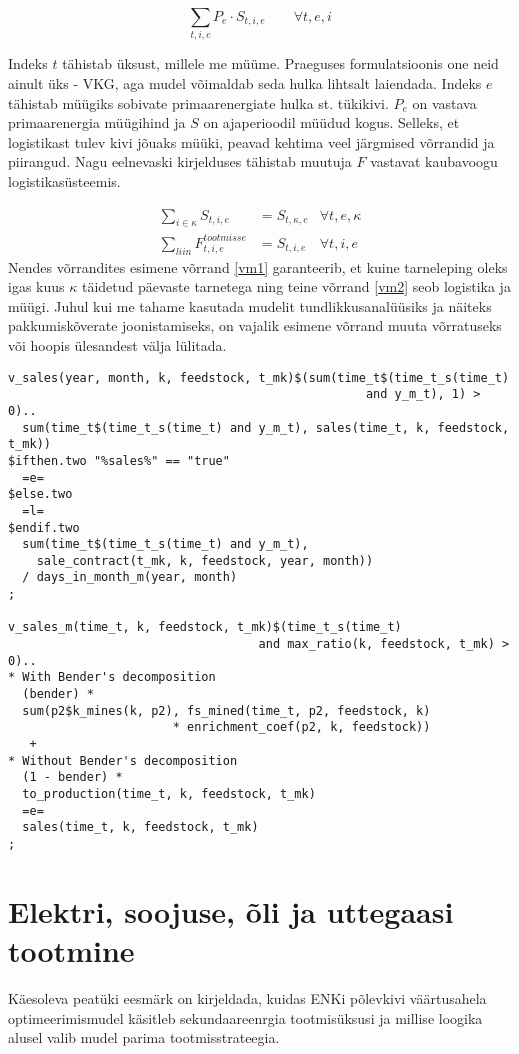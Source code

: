 \documentclass[10pt,a4paper]{article}
\begin{document}
\begin{equation}
\sum_{t,i,e} P_{e} \cdot S_{t,i,e} \qquad \forall t,e,i
\end{equation}

Indeks $t$ tähistab üksust, millele me müüme. Praeguses formulatsioonis one neid ainult üks - VKG, aga mudel võimaldab seda hulka lihtsalt laiendada. Indeks $e$ tähistab müügiks sobivate primaarenergiate hulka st. tükikivi. $P_e$ on vastava primaarenergia müügihind ja $S$ on ajaperioodil müüdud kogus.
Selleks, et logistikast tulev kivi jõuaks müüki, peavad kehtima veel järgmised võrrandid ja piirangud. Nagu eelnevaski kirjelduses tähistab muutuja $F$ vastavat kaubavoogu logistikasüsteemis.

\begin{align}
\sum_{i \in \kappa} S_{t,i,e} &= S_{t,\kappa,e} &\forall t,e,\kappa \label{vm1} \\
\sum_{liin} F^{tootmisse}_{t,i,e} &= S_{t,i,e} &\forall t,i,e \label{vm2}
\end{align}
Nendes võrrandites esimene võrrand \eqref{vm1} garanteerib, et kuine tarneleping oleks igas kuus $\kappa$ täidetud päevaste tarnetega ning teine võrrand \eqref{vm2} seob logistika ja müügi. Juhul kui me tahame kasutada mudelit tundlikkusanalüüsiks ja näiteks pakkumiskõverate joonistamiseks, on vajalik esimene võrrand muuta võrratuseks või hoopis ülesandest välja lülitada. 

\begin{verbatim}
v_sales(year, month, k, feedstock, t_mk)$(sum(time_t$(time_t_s(time_t)
                                                  and y_m_t), 1) > 0)..
  sum(time_t$(time_t_s(time_t) and y_m_t), sales(time_t, k, feedstock, t_mk))
$ifthen.two "%sales%" == "true"
  =e=
$else.two
  =l=
$endif.two
  sum(time_t$(time_t_s(time_t) and y_m_t),
    sale_contract(t_mk, k, feedstock, year, month))
  / days_in_month_m(year, month)
;

v_sales_m(time_t, k, feedstock, t_mk)$(time_t_s(time_t)
                                   and max_ratio(k, feedstock, t_mk) > 0)..
* With Bender's decomposition
  (bender) *
  sum(p2$k_mines(k, p2), fs_mined(time_t, p2, feedstock, k)
                       * enrichment_coef(p2, k, feedstock))
   +
* Without Bender's decomposition
  (1 - bender) *
  to_production(time_t, k, feedstock, t_mk)
  =e=
  sales(time_t, k, feedstock, t_mk)
;
\end{verbatim}

\section{Elektri, soojuse, õli ja uttegaasi tootmine}
Käesoleva peatüki eesmärk on kirjeldada, kuidas ENKi põlevkivi väärtus\-ahela optimeerimismudel käsitleb sekundaareenrgia tootmisüksusi ja millise loogika alusel valib mudel parima tootmisstrateegia.
\end{document}
